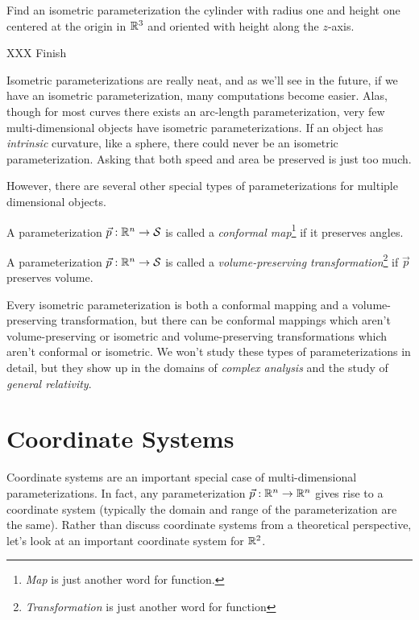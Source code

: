 \begin{example}
	Find an isometric parameterization the cylinder with radius one and height one centered at
	the origin in $\mathbb{R}^3$ and oriented with height along the $z$-axis.

	XXX Finish
\end{example}

Isometric parameterizations are really neat, and as we'll see in the future, if we have an isometric
parameterization, many computations become easier.  Alas, though for most curves there exists
an arc-length parameterization, very few multi-dimensional objects have isometric parameterizations.
If an object has \emph{intrinsic} curvature, like a sphere, there could never be an isometric parameterization.
Asking that both speed and area be preserved is just too much.

However, there are several other special types of parameterizations for multiple dimensional objects.

\begin{definition}
	A parameterization $\vec p:\mathbb{R}^n\to\mathcal S$ is called a \emph{conformal map}\footnote{ \emph{Map}
	is just another word for function.}
	if it preserves angles.
\end{definition}

\begin{definition}
	A parameterization $\vec p:\mathbb{R}^n\to\mathcal S$ is called a \emph{volume-preserving transformation}\footnote{ 
	\emph{Transformation} is just another word for function} if $\vec p$ preserves volume.
\end{definition}

Every isometric parameterization is both a conformal mapping and a volume-preserving transformation, but
there can be conformal mappings which aren't volume-preserving or isometric and volume-preserving transformations
which aren't conformal or isometric.  We won't study these types of parameterizations in detail, but
they show up in the domains of \emph{complex analysis} and the study of \emph{general relativity}.


\begin{exercises}
\end{exercises}

\section{Coordinate Systems}

Coordinate systems are an important special case of multi-dimensional parameterizations.
In fact, any parameterization $\vec p:\mathbb{R}^n\to\mathbb{R}^n$ gives rise to a coordinate system
(typically the domain and range of the parameterization are the same).  Rather than
discuss coordinate systems from a theoretical perspective, let's look at an
important coordinate system for $\mathbb{R}^2$.

